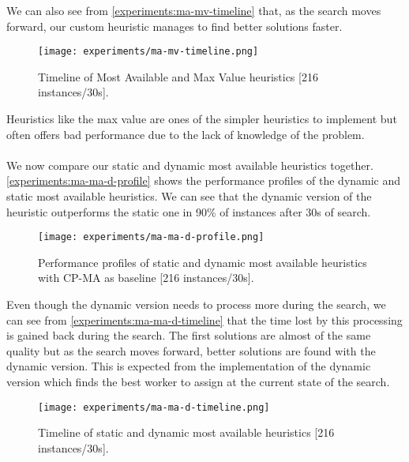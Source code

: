 \documentclass[../../thesis.tex]{subfiles}
\begin{document}
We can also see from \autoref{experiments:ma-mv-timeline} that, as the search moves forward, our custom heuristic manages to 
find better solutions faster.

\begin{figure}
  \centering
  \texttt{[image: experiments/ma-mv-timeline.png]}
  \caption{Timeline of Most Available and Max Value heuristics [216 instances/30s].}
  \label{experiments:ma-mv-timeline}
\end{figure}

Heuristics like the max value are ones of the simpler heuristics to implement but often offers bad performance due to 
the lack of knowledge of the problem.

\paragraph{}

We now compare our static and dynamic most available heuristics together.
\autoref{experiments:ma-ma-d-profile} shows the performance profiles of the dynamic and static most available heuristics.
We can see that the dynamic version of the heuristic outperforms the static one in 90\% of instances after 30s of search.

\begin{figure}
  \centering
  \texttt{[image: experiments/ma-ma-d-profile.png]}
  \caption{Performance profiles of static and dynamic most available heuristics with CP-MA as baseline [216 instances/30s].}
  \label{experiments:ma-ma-d-profile}
\end{figure}

Even though the dynamic version needs to process more during the search, we can see from \autoref{experiments:ma-ma-d-timeline} that the time lost 
by this processing is gained back during the search. The first solutions are almost of the same quality but 
as the search moves forward, better solutions are found with the dynamic version. 
This is expected from the implementation of the dynamic version which finds the best worker to assign 
at the current state of the search.

\begin{figure}
  \centering
  \texttt{[image: experiments/ma-ma-d-timeline.png]}
  \caption{Timeline of static and dynamic most available heuristics [216 instances/30s].}
  \label{experiments:ma-ma-d-timeline}
\end{figure}


\paragraph{}
\end{document}
